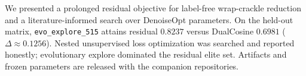 We presented a prolonged residual objective for label-free wrap-crackle reduction and a literature-informed search over DenoiseOpt parameters. On the held-out matrix, \texttt{evo\_explore\_515} attains residual $0.8237$ versus DualCosine $0.6981$ ($\Delta\approx 0.1256$). Nested unsupervised loss optimization was searched and reported honestly; evolutionary explore dominated the residual elite set. Artifacts and frozen parameters are released with the companion repositories.
